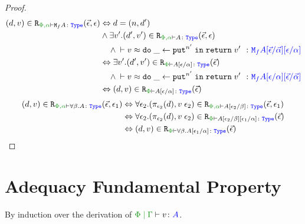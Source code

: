 \begin{proof}
        \begin{align*}
            \inLogRel{d}{v}{\P,\a}{\M{f}{A}}{\ev, \e} & \Leftrightarrow d= (n, d')
            \\ & \wedge \exists v'. \inLogRel{d'}{v'}{\P,\a}{A}{\ev, \e}
            \\ & \quad\wedge  \zberelation{v}{\doin{\_}{\put^{n'}}{\return{v'}}}{\M{f}{A}\ssub{\av}{\ev}\ssub{\a}{\e}}
            \\ & \Leftrightarrow \exists v'. \inLogRelPE{d'}{v'}{A\ssub{\a}{\e}}
            \\ & \quad\wedge  \zberelation{v}{\doin{\_}{\put^{n'}}{\return{v'}}}{\M{f}{A}\ssub{\a}{\e}\ssub{\av}{\ev}}
            \\ & \Leftrightarrow \inLogRelPE{d}{v}{A\ssub{\a}{\e}}
        \end{align*}
    \case{\tquant}
    \begin{align*}
        \inLogRel{d}{v}{\P,\a}{\all{\b}{A}}{\ev, \e_1} & \Leftrightarrow \forall \e_2. \inLogRel{\pi_{\e_2}(d)}{\eapp{v}{\e_2}}{\P,\a}{A\ssub{\b}{\e_2}}{\ev, \e_1}
        \\
        & \Leftrightarrow \forall \e_2. \inLogRelPE{\pi_{\e_2}(d)}{\eapp{v}{\e_2}}{A\ssub{\b}{\e_2}\ssub{\a}{\e_1}}
        \\
        & \Leftrightarrow \inLogRelPE{d}{v}{\all{\b}{A\ssub{\a}{\e_1}}}
    \end{align*}
    
\end{proof}

\section{Adequacy Fundamental Property}
\label{AdequacyFundamentalPropertyProof}
By induction over the derivation of $\gpetyperelation{v}{A}$.

